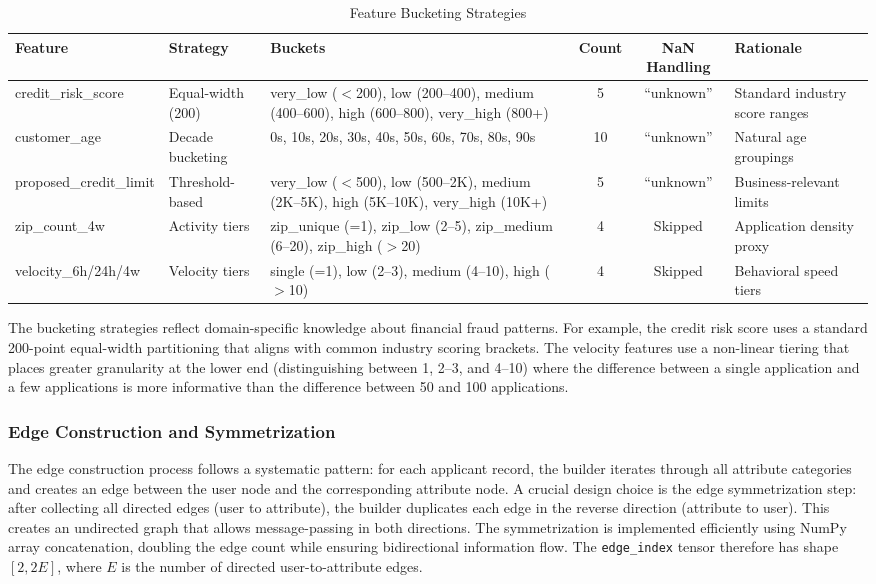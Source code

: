 \begin{table}[H]
\centering
\caption{Feature Bucketing Strategies}
\label{tab:ch4-bucketing}
\footnotesize
\setlength{\tabcolsep}{3pt}
\begin{tabularx}{\textwidth}{llXccX}
\toprule
\textbf{Feature} & \textbf{Strategy} & \textbf{Buckets} & \textbf{Count} & \textbf{NaN Handling} & \textbf{Rationale} \\
\midrule
credit\_risk\_score & Equal-width (200) & very\_low ($<$200), low (200--400), medium (400--600), high (600--800), very\_high (800+) & 5 & ``unknown'' & Standard industry score ranges \\
customer\_age & Decade bucketing & 0s, 10s, 20s, 30s, 40s, 50s, 60s, 70s, 80s, 90s & 10 & ``unknown'' & Natural age groupings \\
proposed\_credit\_limit & Threshold-based & very\_low ($<$500), low (500--2K), medium (2K--5K), high (5K--10K), very\_high (10K+) & 5 & ``unknown'' & Business-relevant limits \\
zip\_count\_4w & Activity tiers & zip\_unique (=1), zip\_low (2--5), zip\_medium (6--20), zip\_high ($>$20) & 4 & Skipped & Application density proxy \\
velocity\_6h/24h/4w & Velocity tiers & single (=1), low (2--3), medium (4--10), high ($>$10) & 4 & Skipped & Behavioral speed tiers \\
\bottomrule
\end{tabularx}
\end{table}

The bucketing strategies reflect domain-specific knowledge about financial fraud patterns. For example, the credit risk score uses a standard 200-point equal-width partitioning that aligns with common industry scoring brackets. The velocity features use a non-linear tiering that places greater granularity at the lower end (distinguishing between 1, 2--3, and 4--10) where the difference between a single application and a few applications is more informative than the difference between 50 and 100 applications.

\subsubsection{Edge Construction and Symmetrization}

The edge construction process follows a systematic pattern: for each applicant record, the builder iterates through all attribute categories and creates an edge between the user node and the corresponding attribute node. A crucial design choice is the edge symmetrization step: after collecting all directed edges (user to attribute), the builder duplicates each edge in the reverse direction (attribute to user). This creates an undirected graph that allows message-passing in both directions. The symmetrization is implemented efficiently using NumPy array concatenation, doubling the edge count while ensuring bidirectional information flow. The \texttt{edge\_index} tensor therefore has shape $[2, 2E]$, where $E$ is the number of directed user-to-attribute edges.

